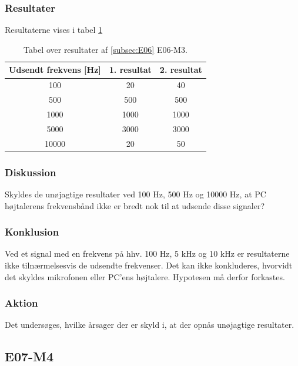 		\subsubsection{Resultater}
		Resultaterne vises i tabel \ref{E06 resultater}
		\begin{table}[htb]
				\centering
				\caption{Tabel over resultater af \ref{subsec:E06} E06-M3.} 
				\label{E06 resultater}
				\begin{tabular}{ccc}
					\multicolumn{1}{c|}{\textbf{Udsendt frekvens {[}Hz{]}}} & 	
					\multicolumn{1}{c|}{\textbf{1. resultat}} & \textbf{2. resultat} \\ \hline
					\multicolumn{1}{c|}{100}& 
					\multicolumn{1}{c|}{20}&40\\
					\multicolumn{1}{c|}{500}& 
					\multicolumn{1}{c|}{500}&500\\
					\multicolumn{1}{c|}{1000}& 
					\multicolumn{1}{c|}{1000}&1000\\
					\multicolumn{1}{c|}{5000}& 
					\multicolumn{1}{c|}{3000}&3000\\
					\multicolumn{1}{c|}{10000}& 
					\multicolumn{1}{c|}{20}&50\\
                   
				\end{tabular}
			\end{table}
		
		\subsubsection{Diskussion} 
		Skyldes de unøjagtige resultater ved 100 Hz, 500 Hz og 10000 Hz, at PC højtalerens frekvensbånd ikke er bredt nok til at udsende disse signaler?
		 \subsubsection{Konklusion}
	Ved et signal med en frekvens på hhv. 100 Hz, 5 kHz og 10 kHz er resultaterne ikke tilnærmelsesvis de udsendte frekvenser. 
	Det kan ikke konkluderes, hvorvidt det skyldes mikrofonen eller PC'ens højtalere. Hypotesen må derfor forkastes.  
		\subsubsection{Aktion}
		Det undersøges, hvilke årsager der er skyld i, at der opnås unøjagtige resultater.  
		
		
\subsection{E07-M4}
\label{subsec:E07}
